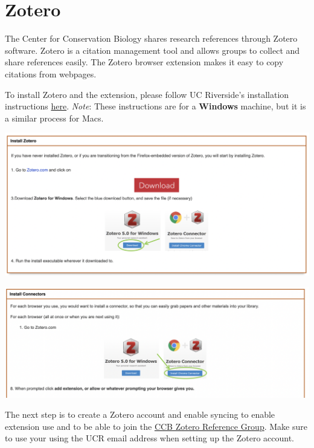 \documentclass[
]{book}
\begin{document}
\hypertarget{zotero}{%
\section{Zotero}\label{zotero}}

The Center for Conservation Biology shares research references through Zotero software. Zotero is a citation management tool and allows groups to collect and share references easily. The Zotero browser extension makes it easy to copy citations from webpages.

To install Zotero and the extension, please follow UC Riverside's installation instructions \href{https://guides.lib.ucr.edu/c.php?g=171064}{here}. \emph{Note}: These instructions are for a \textbf{Windows} machine, but it is a similar process for Macs.

\begin{center}\includegraphics[width=0.8\linewidth]{images/zoteroinstall} \end{center}

\begin{center}\includegraphics[width=0.8\linewidth]{images/zoteroextension} \end{center}

The next step is to create a Zotero account and enable syncing to enable extension use and to be able to join the \href{https://www.zotero.org/groups/4734848/ccbucr}{CCB Zotero Reference Group}. Make sure to use your using the UCR email address when setting up the Zotero account.
\end{document}

